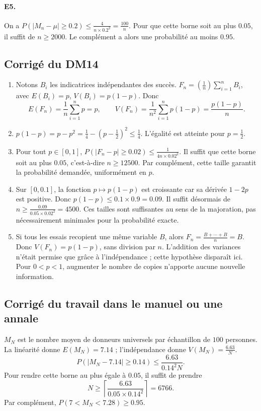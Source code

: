 \paragraph{E5.}On a $P(|M_n-\mu|\ge\num{0,2})\le\frac{4}{n\times\num{0,2}^2}=\frac{100}{n}$. Pour que cette borne soit au plus $\num{0,05}$, il suffit de $n\ge2000$. Le complément a alors une probabilité au moins $\num{0,95}$.

\subsection{Corrigé du DM14}\begin{enumerate}
\item Notons $B_i$ les indicatrices indépendantes des succès. $F_n=(\frac{1}{n})\sum_{i=1}^nB_i$, avec $E(B_i)=p$, $V(B_i)=p(1-p)$. Donc
\[E(F_n)=\frac1n\sum_{i=1}^n p=p,\qquad V(F_n)=\frac1{n^2}\sum_{i=1}^np(1-p)=\frac{p(1-p)}n.\]
\item $p(1-p)=p-p^2=\frac{1}{4}-(p-\frac{1}{2})^2\le\frac{1}{4}$. L'égalité est atteinte pour $p=\frac{1}{2}$.
\item Pour tout $p\in[0,1]$, $P(|F_n-p|\ge\num{0,02})\le\frac{1}{4n\times\num{0,02}^2}$. Il suffit que cette borne soit au plus $\num{0,05}$, c'est-à-dire $n\ge12500$. Par complément, cette taille garantit la probabilité demandée, uniformément en $p$.
\item Sur $[0,\num{0,1}]$, la fonction $p\mapsto p(1-p)$ est croissante car sa dérivée $1-2p$ est positive. Donc $p(1-p)\le\num{0,1}\times\num{0,9}=\num{0,09}$. Il suffit désormais de $n\ge\frac{\num{0,09}}{\num{0,05}\times\num{0,02}^2}=4500$. Ces tailles sont suffisantes au sens de la majoration, pas nécessairement minimales pour la probabilité exacte.
\item Si tous les essais recopient une même variable $B$, alors $F_n=\frac{B+\cdots+B}{n}=B$. Donc $V(F_n)=p(1-p)$, sans division par $n$. L'addition des variances n'était permise que grâce à l'indépendance ; cette hypothèse disparaît ici. Pour $0<p<1$, augmenter le nombre de copies n'apporte aucune nouvelle information.
\end{enumerate}

\subsection{Corrigé du travail dans le manuel ou une annale}$M_N$ est le nombre moyen de donneurs universels par échantillon de $100$ personnes. La linéarité donne $E(M_N)=\num{7,14}$ ; l'indépendance donne $V(M_N)=\frac{\num{6,63}}N$.
\[P(|M_N-\num{7,14}|\ge\num{0,14})\le\frac{\num{6,63}}{\num{0,14}^2N}.\]
Pour rendre cette borne au plus égale à $\num{0,05}$, il suffit de prendre
\[N\ge\left\lceil\frac{\num{6,63}}{\num{0,05}\times\num{0,14}^2}\right\rceil=6766.\]
Par complément, $P(7<M_N<\num{7,28})\ge\num{0,95}$.

\fi


